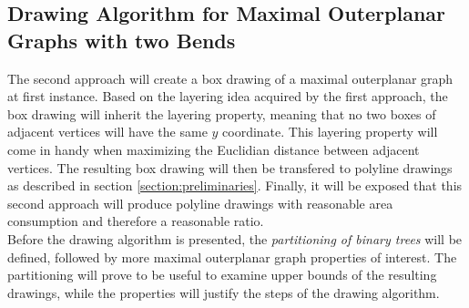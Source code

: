 \subsection{Drawing Algorithm for Maximal Outerplanar Graphs with two Bends}
The second approach will create a box drawing of a maximal outerplanar graph at first instance. Based on the layering idea acquired by the first approach, the box drawing will inherit the layering property, meaning that no two boxes of adjacent vertices will have the same $y$ coordinate. This layering property will come in handy when maximizing the Euclidian distance between adjacent vertices. The resulting box drawing will then be transfered to polyline drawings as described in section \ref{section:preliminaries}. Finally, it will be exposed that this second approach will produce polyline drawings with reasonable area consumption and therefore a reasonable ratio.\\
Before the drawing algorithm is presented, the \emph{partitioning of binary trees} will be defined, followed by more maximal outerplanar graph properties of interest. The partitioning will prove to be useful to examine upper bounds of the resulting drawings, while the properties will justify the steps of the drawing algorithm.
